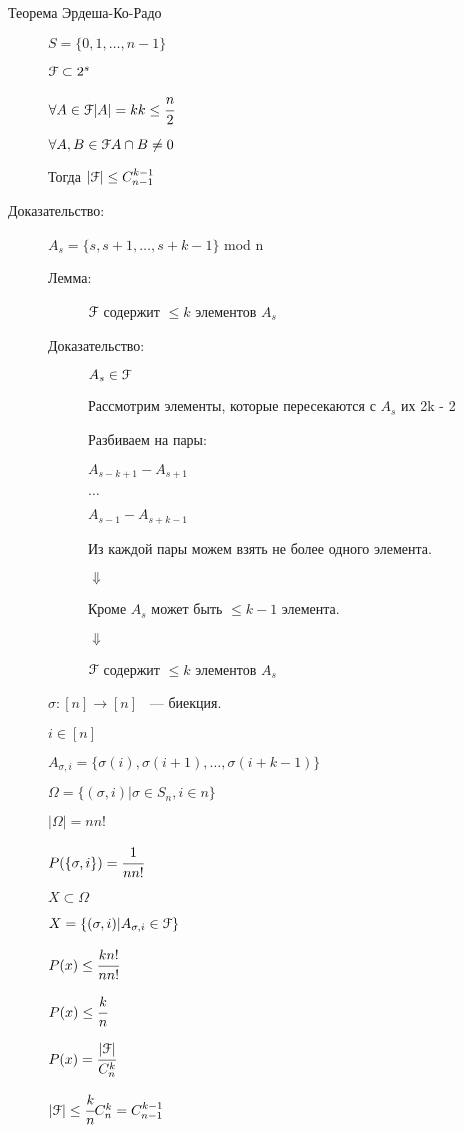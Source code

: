 \documentclass[12pt]{article}
\begin{document}
\begin{description}

\item[Теорема Эрдеша-Ко-Радо]

$S = \{0, 1, \ldots, n - 1\}$

$\EuScript F \subset 2^s$

$\forall A \in \EuScript F |A| = k k \le \cfrac{n}{2}$

$\forall A, B \in \EuScript F A \cap B \ne 0$

Тогда $|\EuScript F| \le C_{n-1}^{k - 1}$

\item[Доказательство:]

    $A_s = \{s, s  +1, \ldots, s+ k -1\}$ mod n 
    \begin{description}
    \item[Лемма:] $\EuScript F$ содержит $\le k$ элементов $A_s$
    \item[Доказательство:] $A_s \in \EuScript F$ 

      Рассмотрим элементы, которые пересекаются с $A_s$ их 2k - 2

      Разбиваем на пары:

     $A_{s - k +1}  - A_{s + 1}$

    $\ldots$

     $A_{s - 1}  - A_{s + k - 1}$   

     Из каждой пары можем взять не более одного элемента. 

    $\Downarrow$

    Кроме $A_s$ может быть $\le k - 1$ элемента.

   $\Downarrow$

   $\EuScript F$ содержит $\le k$ элементов $A_s$ 
    \end{description}
   $\sigma:[n]\to [n]$ ~--- биекция.
    
    $i \in [n]$

   $A_{\sigma, i} = \{\sigma (i), \sigma (i + 1), \ldots, \sigma (i + k - 1)\}$

    $\Omega = \{(\sigma ,i)| \sigma \in S_n, i \in n\}$
   
     $|\Omega| = n n!$

   $P(\{\sigma, i\}) = \cfrac{1}{n n!}$

     $X \subset \Omega$

      $X = \{(\sigma, i)|A_{\sigma, i} \in \EuScript F\}$

     
     $P(x)\le \cfrac{k n!}{n n!}$


     $P(x)\le \cfrac{k}{n}$

    $P(x) = \cfrac{|\EuScript F|}{C_n^k}$

      $|\EuScript F| \le \cfrac{k}{n}C_n^k = C_{n -1}^{k - 1}$
\end{description}
\end{document}
